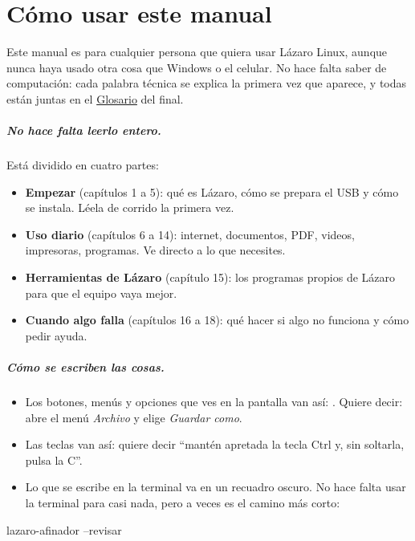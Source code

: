 \chapter*{Cómo usar este manual}

Este manual es para cualquier persona que quiera usar Lázaro Linux, aunque
nunca haya usado otra cosa que Windows o el celular. No hace falta saber
de computación: cada palabra técnica se explica la primera vez que
aparece, y todas están juntas en el \hyperref[cap:a-glosario]{Glosario} del
final.

\paragraph{No hace falta leerlo entero.} Está dividido en cuatro partes:
\begin{itemize}
  \item \textbf{Empezar} (capítulos 1 a 5): qué es Lázaro, cómo se prepara el
        USB y cómo se instala. Léela de corrido la primera vez.
  \item \textbf{Uso diario} (capítulos 6 a 14): internet, documentos, PDF,
        videos, impresoras, programas. Ve directo a lo que necesites.
  \item \textbf{Herramientas de Lázaro} (capítulo 15): los programas propios
        de Lázaro para que el equipo vaya mejor.
  \item \textbf{Cuando algo falla} (capítulos 16 a 18): qué hacer si algo
        no funciona y cómo pedir ayuda.
\end{itemize}

\paragraph{Cómo se escriben las cosas.}
\begin{itemize}
  \item Los botones, menús y opciones que ves en la pantalla van así:
        . Quiere decir: abre el menú
        \emph{Archivo} y elige \emph{Guardar como}.
  \item Las teclas van así:  quiere decir \enquote{mantén
        apretada la tecla Ctrl y, sin soltarla, pulsa la C}.
  \item Lo que se escribe en la terminal va en un recuadro oscuro. No hace
        falta usar la terminal para casi nada, pero a veces es el camino más
        corto:
\end{itemize}
\begin{terminal}
lazaro-afinador --revisar
\end{terminal}

